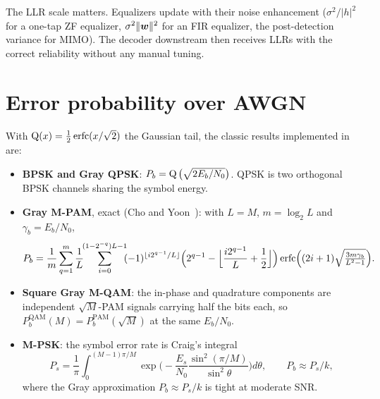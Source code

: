 \begin{keypoint}
The LLR scale matters. Equalizers update  with their noise enhancement
($\sigma^2/|h|^2$ for a one-tap ZF equalizer, $\sigma^2\|\bm{w}\|^2$ for an FIR equalizer,
the post-detection variance for MIMO). The decoder downstream then receives LLRs with the
correct reliability without any manual tuning.
\end{keypoint}

\section{Error probability over AWGN}\label{sec:ber-awgn}
With $\operatorname{Q}(x)=\frac12\operatorname{erfc}(x/\sqrt2)$ the Gaussian tail, the classic results implemented in
 are:
\begin{itemize}
  \item \textbf{BPSK and Gray QPSK}: $P_b=\operatorname{Q}\big(\sqrt{2E_b/N_0}\big)$. QPSK is two orthogonal BPSK
  channels sharing the symbol energy.
  \item \textbf{Gray M-PAM}, exact (Cho and Yoon~\cite{cho2002}): with $L=M$, $m=\log_2L$ and
  $\gamma_b=E_b/N_0$,
  \begin{equation}
    P_b=\frac1m\sum_{q=1}^{m}\frac1L\!\!\sum_{i=0}^{(1-2^{-q})L-1}\!\!
    (-1)^{\lfloor i2^{q-1}/L\rfloor}\Big(2^{q-1}-\Big\lfloor\frac{i2^{q-1}}{L}+\frac12\Big\rfloor\Big)
    \operatorname{erfc}\!\Big((2i+1)\sqrt{\tfrac{3m\gamma_b}{L^2-1}}\Big).
  \end{equation}
  \item \textbf{Square Gray M-QAM}: the in-phase and quadrature components are independent
  $\sqrt M$-PAM signals carrying half the bits each, so $P_b^{\text{QAM}}(M)=P_b^{\text{PAM}}(\sqrt M)$
  at the same $E_b/N_0$.
  \item \textbf{M-PSK}: the symbol error rate is Craig's integral~\cite{craig1991}
  \begin{equation}
    P_s=\frac1\pi\int_0^{(M-1)\pi/M}\exp\!\Big(-\frac{E_s}{N_0}\frac{\sin^2(\pi/M)}{\sin^2\theta}\Big)d\theta,
    \qquad P_b\approx P_s/k ,
  \end{equation}
  where the Gray approximation $P_b\approx P_s/k$ is tight at moderate SNR.
\end{itemize}

